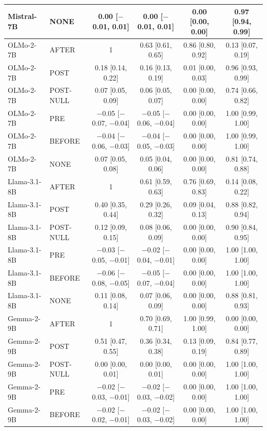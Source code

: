 \begin{tabular}{llcccc}
Mistral-7B & NONE & 0.00 [$-$0.01, 0.01] & 0.00 [$-$0.01, 0.01] & 0.00 [0.00, 0.00] & 0.97 [0.94, 0.99] \\
\midrule
OLMo-2-7B & AFTER & 1 & 0.63 [0.61, 0.65] & 0.86 [0.80, 0.92] & 0.13 [0.07, 0.19] \\
OLMo-2-7B & POST & 0.18 [0.14, 0.22] & 0.16 [0.13, 0.19] & 0.01 [0.00, 0.03] & 0.96 [0.93, 0.99] \\
OLMo-2-7B & POST-NULL & 0.07 [0.05, 0.09] & 0.06 [0.05, 0.07] & 0.00 [0.00, 0.00] & 0.74 [0.66, 0.82] \\
OLMo-2-7B & PRE & $-$0.05 [$-$0.07, $-$0.04] & $-$0.05 [$-$0.06, $-$0.04] & 0.00 [0.00, 0.00] & 1.00 [0.99, 1.00] \\
OLMo-2-7B & BEFORE & $-$0.04 [$-$0.06, $-$0.03] & $-$0.04 [$-$0.05, $-$0.03] & 0.00 [0.00, 0.00] & 1.00 [0.99, 1.00] \\
OLMo-2-7B & NONE & 0.07 [0.05, 0.08] & 0.05 [0.04, 0.06] & 0.00 [0.00, 0.00] & 0.81 [0.74, 0.88] \\
\midrule
Llama-3.1-8B & AFTER & 1 & 0.61 [0.59, 0.63] & 0.76 [0.69, 0.83] & 0.14 [0.08, 0.22] \\
Llama-3.1-8B & POST & 0.40 [0.35, 0.44] & 0.29 [0.26, 0.32] & 0.09 [0.04, 0.13] & 0.88 [0.82, 0.94] \\
Llama-3.1-8B & POST-NULL & 0.12 [0.09, 0.15] & 0.08 [0.06, 0.09] & 0.00 [0.00, 0.00] & 0.90 [0.84, 0.95] \\
Llama-3.1-8B & PRE & $-$0.03 [$-$0.05, $-$0.01] & $-$0.02 [$-$0.04, $-$0.01] & 0.00 [0.00, 0.00] & 1.00 [1.00, 1.00] \\
Llama-3.1-8B & BEFORE & $-$0.06 [$-$0.08, $-$0.05] & $-$0.05 [$-$0.07, $-$0.04] & 0.00 [0.00, 0.00] & 1.00 [1.00, 1.00] \\
Llama-3.1-8B & NONE & 0.11 [0.08, 0.14] & 0.07 [0.06, 0.09] & 0.00 [0.00, 0.00] & 0.88 [0.81, 0.93] \\
\midrule
Gemma-2-9B & AFTER & 1 & 0.70 [0.69, 0.71] & 1.00 [0.99, 1.00] & 0.00 [0.00, 0.00] \\
Gemma-2-9B & POST & 0.51 [0.47, 0.55] & 0.36 [0.34, 0.38] & 0.13 [0.09, 0.19] & 0.84 [0.77, 0.89] \\
Gemma-2-9B & POST-NULL & 0.00 [0.00, 0.01] & 0.00 [0.00, 0.01] & 0.00 [0.00, 0.00] & 1.00 [1.00, 1.00] \\
Gemma-2-9B & PRE & $-$0.02 [$-$0.03, $-$0.01] & $-$0.02 [$-$0.03, $-$0.02] & 0.00 [0.00, 0.00] & 1.00 [1.00, 1.00] \\
Gemma-2-9B & BEFORE & $-$0.02 [$-$0.02, $-$0.01] & $-$0.02 [$-$0.03, $-$0.02] & 0.00 [0.00, 0.00] & 1.00 [1.00, 1.00] \\

\end{tabular}
